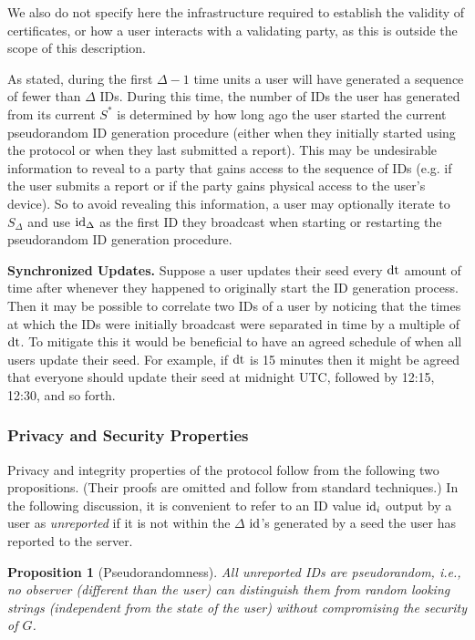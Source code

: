 \documentclass{article}
\newtheorem{proposition}{Proposition}
\begin{document}
We also do not specify here the infrastructure required to establish the validity of certificates, or how a user interacts with a validating party, as this is outside the scope of this description. 

As stated, during the first $\Delta-1$ time units a user will have generated a sequence of fewer than $\Delta$ IDs.
During this time, the number of IDs the user has generated from its current $S^\ast$ is determined by how long ago the user started the current pseudorandom ID generation procedure (either when they initially started using the protocol or when they last submitted a report).   
This may be undesirable information to reveal to a party that gains access to the sequence of IDs (e.g. if the user submits a report or if the party gains physical access to the user's device). 
So to avoid revealing this information, a user may optionally iterate to $S_{\Delta}$ and use $\mathrm{id}_{\Delta}$ as the first ID they broadcast when starting or restarting the pseudorandom ID generation procedure.

{\bf Synchronized Updates.}
Suppose a user updates their seed every $\mathrm{dt}$ amount of time after whenever they happened to originally start the ID generation process.
Then it may be possible to correlate two IDs of a user by noticing that the times at which the IDs were initially broadcast were separated in time by a multiple of $\mathrm{dt}$.
To mitigate this it would be beneficial to have an agreed schedule of when all users update their seed.
For example, if $\mathrm{dt}$ is 15 minutes then it might be agreed that everyone should update their seed at midnight UTC, followed by 12:15, 12:30, and so forth.


\subsubsection{Privacy and Security Properties}

Privacy and integrity properties of the protocol follow from the following two propositions. (Their proofs are omitted and follow from standard techniques.) In the following discussion, it is convenient to refer to an ID value $\mathrm{id}_i$ output by a user as {\em unreported} if it is not within the $\Delta$ $\mathrm{id}$'s generated by a seed the user has reported to the server. 

\begin{proposition}[Pseudorandomness]
   All unreported IDs are pseudorandom, i.e., no observer (different than the user) can distinguish them from random looking strings (independent from the state of the user) without compromising the security of $G$.
\end{proposition}
\end{document}
